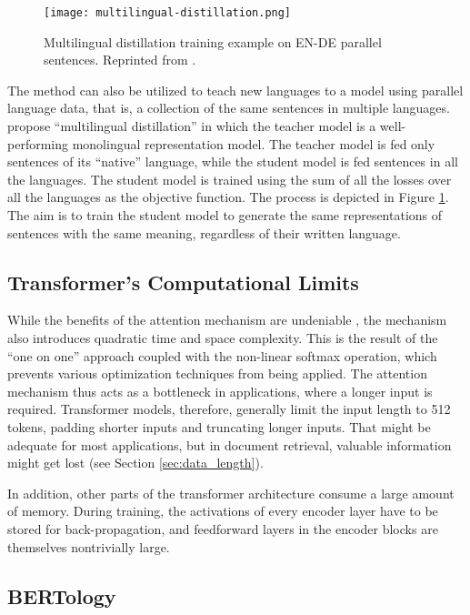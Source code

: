 \begin{figure}[!htb]
        \centering
        \texttt{[image: multilingual-distillation.png]}
        \caption[Multilingual Distillation]{Multilingual distillation training example on EN-DE parallel sentences. Reprinted from \citep{student-teacher}.}
        \label{fig:multilingual_distillation}
\end{figure}

The method can also be utilized to teach new languages to a model using parallel language data, that is, a collection of the same sentences in multiple languages.
\citet{student-teacher} propose ``multilingual distillation'' in which the teacher model is a well-performing monolingual representation model. 
The teacher model is fed only sentences of its ``native'' language, while the student model is fed sentences in all the languages. 
The student model is trained using the sum of all the losses over all the languages as the objective function.
The process is depicted in Figure \ref{fig:multilingual_distillation}.
The aim is to train the student model to generate the same representations of sentences with the same meaning, regardless of their written language.

\subsection{Transformer's Computational Limits}

While the benefits of the attention mechanism are undeniable \citep{attention-is-all-you-need}, the mechanism also introduces quadratic time and space complexity.
This is the result of the ``one on one'' approach coupled with the non-linear softmax operation, which prevents various optimization techniques from being applied.
The attention mechanism thus acts as a bottleneck in applications, where a longer input is required.
Transformer models, therefore, generally limit the input length to 512 tokens, padding shorter inputs and truncating longer inputs.
That might be adequate for most applications, but in document retrieval, valuable information might get lost (see Section \ref{sec:data_length}).

In addition, other parts of the transformer architecture consume a large amount of memory. During training, the activations of every encoder layer have to be stored for back-propagation, and feedforward layers in the encoder blocks are themselves nontrivially large.

\subsection{BERTology}
\label{subsec:bertology}

